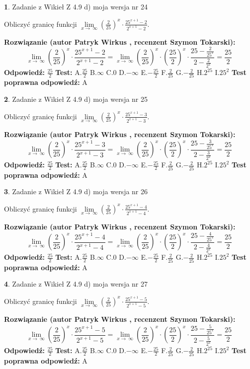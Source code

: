 \documentclass[12pt, a4paper]{article}
\theoremstyle{definition} %
\newtheorem{zad}{}
\newcommand{\zadStart}[1]{\begin{zad}#1\newline}
\newcommand{\zadStop}{\end{zad}}
\newcommand{\rozwStart}[2]{\noindent \textbf{Rozwiązanie (autor #1 , recenzent #2): }\newline}
\newcommand{\rozwStop}{\newline}
\newcommand{\odpStart}{\noindent \textbf{Odpowiedź:}\newline}
\newcommand{\odpStop}{\newline}
\newcommand{\testStart}{\noindent \textbf{Test:}\newline}
\newcommand{\testStop}{\newline}
\newcommand{\kluczStart}{\noindent \textbf{Test poprawna odpowiedź:}\newline}
\newcommand{\kluczStop}{\newline}
\begin{document}
\zadStart{Zadanie z Wikieł Z 4.9 d) moja wersja nr 24}


Obliczyć granicę funkcji  $\lim\limits_{x\to\ \infty}(\frac{2}{25})^{x}\cdot\frac{25^{x+1}-2}{2^{x+1}-2}$.
\zadStop
\rozwStart{Patryk Wirkus}{Szymon Tokarski}
$$\lim\limits_{x\to\ \infty}(\frac{2}{25})^{x}\cdot\frac{25^{x+1}-2}{2^{x+1}-2}=\lim\limits_{x\to\ \infty}(\frac{2}{25})^{x}\cdot(\frac{25}{2})^{x} \cdot \frac{25-\frac{2}{25^{x}}}{2-\frac{2}{2^{x}}} = \frac{25}{2}$$
\rozwStop
\odpStart
$\frac{25}{2}$
\odpStop
\testStart
A.$\frac{25}{2}$ B.$\infty$ C.$0$ D.$-\infty$ E.$-\frac{25}{2}$
F.$\frac{2}{25}$ G.$-\frac{2}{25}$
H.$2^{25}$
I.$25^{2}$
\testStop
\kluczStart
A
\kluczStop



\zadStart{Zadanie z Wikieł Z 4.9 d) moja wersja nr 25}


Obliczyć granicę funkcji  $\lim\limits_{x\to\ \infty}(\frac{2}{25})^{x}\cdot\frac{25^{x+1}-3}{2^{x+1}-3}$.
\zadStop
\rozwStart{Patryk Wirkus}{Szymon Tokarski}
$$\lim\limits_{x\to\ \infty}(\frac{2}{25})^{x}\cdot\frac{25^{x+1}-3}{2^{x+1}-3}=\lim\limits_{x\to\ \infty}(\frac{2}{25})^{x}\cdot(\frac{25}{2})^{x} \cdot \frac{25-\frac{3}{25^{x}}}{2-\frac{3}{2^{x}}} = \frac{25}{2}$$
\rozwStop
\odpStart
$\frac{25}{2}$
\odpStop
\testStart
A.$\frac{25}{2}$ B.$\infty$ C.$0$ D.$-\infty$ E.$-\frac{25}{2}$
F.$\frac{2}{25}$ G.$-\frac{2}{25}$
H.$2^{25}$
I.$25^{2}$
\testStop
\kluczStart
A
\kluczStop



\zadStart{Zadanie z Wikieł Z 4.9 d) moja wersja nr 26}


Obliczyć granicę funkcji  $\lim\limits_{x\to\ \infty}(\frac{2}{25})^{x}\cdot\frac{25^{x+1}-4}{2^{x+1}-4}$.
\zadStop
\rozwStart{Patryk Wirkus}{Szymon Tokarski}
$$\lim\limits_{x\to\ \infty}(\frac{2}{25})^{x}\cdot\frac{25^{x+1}-4}{2^{x+1}-4}=\lim\limits_{x\to\ \infty}(\frac{2}{25})^{x}\cdot(\frac{25}{2})^{x} \cdot \frac{25-\frac{4}{25^{x}}}{2-\frac{4}{2^{x}}} = \frac{25}{2}$$
\rozwStop
\odpStart
$\frac{25}{2}$
\odpStop
\testStart
A.$\frac{25}{2}$ B.$\infty$ C.$0$ D.$-\infty$ E.$-\frac{25}{2}$
F.$\frac{2}{25}$ G.$-\frac{2}{25}$
H.$2^{25}$
I.$25^{2}$
\testStop
\kluczStart
A
\kluczStop



\zadStart{Zadanie z Wikieł Z 4.9 d) moja wersja nr 27}


Obliczyć granicę funkcji  $\lim\limits_{x\to\ \infty}(\frac{2}{25})^{x}\cdot\frac{25^{x+1}-5}{2^{x+1}-5}$.
\zadStop
\rozwStart{Patryk Wirkus}{Szymon Tokarski}
$$\lim\limits_{x\to\ \infty}(\frac{2}{25})^{x}\cdot\frac{25^{x+1}-5}{2^{x+1}-5}=\lim\limits_{x\to\ \infty}(\frac{2}{25})^{x}\cdot(\frac{25}{2})^{x} \cdot \frac{25-\frac{5}{25^{x}}}{2-\frac{5}{2^{x}}} = \frac{25}{2}$$
\rozwStop
\odpStart
$\frac{25}{2}$
\odpStop
\testStart
A.$\frac{25}{2}$ B.$\infty$ C.$0$ D.$-\infty$ E.$-\frac{25}{2}$
F.$\frac{2}{25}$ G.$-\frac{2}{25}$
H.$2^{25}$
I.$25^{2}$
\testStop
\kluczStart
A
\kluczStop
\end{document}
